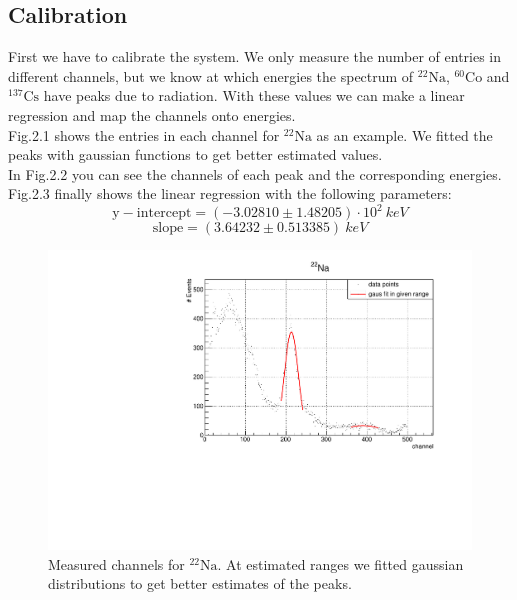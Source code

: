 \subsection{Calibration}

First we have to calibrate the system. We only measure the number of entries in different channels, but we know at which energies the spectrum of ${}^{22}\mathrm{Na}$, $^{60}\mathrm{Co}$ and $^{137}\mathrm{Cs}$ have peaks due to radiation. With these values we can make a linear regression and map the channels onto energies. \\
Fig.2.1 shows the entries in each channel for ${}^{22}\mathrm{Na}$ as an example. We fitted the peaks with gaussian functions to get better estimated values. \\
In Fig.2.2 you can see the channels of each peak and the corresponding energies. Fig.2.3 finally shows the linear regression with the following parameters:
$$\mathrm{y-intercept} = (-3.02810 \pm 1.48205) \cdot 10^{2} \ keV$$
$$\mathrm{slope} =  (3.64232 \pm 0.513385) \ keV$$

\begin{figure}[h]
\centering
\includegraphics[scale=0.5]{./../plots/calibration/NA_22_fit.pdf}
\caption{Measured channels for ${}^{22}\mathrm{Na}$. At estimated ranges we fitted gaussian distributions to get better estimates of the peaks.}
\end{figure}

\newpage

